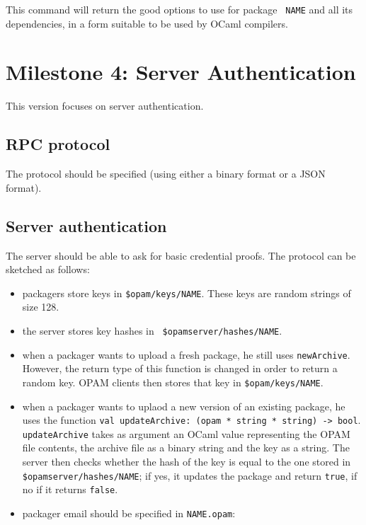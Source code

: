 \documentclass[a4paper,11pt]{article}
\begin{document}
This command will return the good options to use for package {\tt
  NAME} and all its dependencies, in a form suitable to be used by
OCaml compilers.

\section{Milestone 4: Server Authentication}

This version focuses on server authentication.

\subsection{RPC protocol}

The protocol should be specified (using either a binary format or a
JSON format).

\subsection{Server authentication}

The server should be able to ask for basic credential proofs. The
protocol can be sketched as follows:

\begin{itemize}

\item packagers store keys in {\tt \$opam/keys/NAME}. These keys are
  random strings of size 128.

\item the server stores key hashes in {\tt
  \$opamserver/hashes/NAME}.

\item when a packager wants to upload a fresh package, he still uses
  {\tt newArchive}. However, the return type of this function is
  changed in order to return a random key. OPAM clients then stores
  that key in {\tt \$opam/keys/NAME}.

\item when a packager wants to uplaod a new version of an existing
  package, he uses the function {\tt val updateArchive: (opam * string
    * string) -> bool}. {\tt updateArchive} takes as argument an OCaml
  value representing the OPAM file contents, the archive file as a
  binary string and the key as a string. The server then checks
  whether the hash of the key is equal to the one stored in {\tt
    \$opamserver/hashes/NAME}; if yes, it updates the
  package and return {\tt true}, if no if it returns {\tt false}.

\item packager email should be specified in {\tt NAME.opam}:

\end{itemize}
\end{document}
